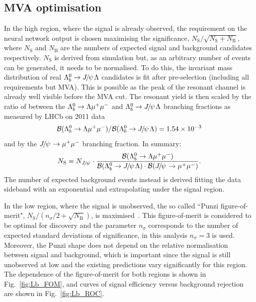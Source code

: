 







\subsection{MVA optimisation}
\label{sec:Lb_mva_opt}

In the high \qsq region, where the signal is already observed, the requirement on the neural network output
is chosen maximising the significance, $N_{\mathrm{S}}/\sqrt{N_{\mathrm{S}}+N_{\mathrm{B}}}$, where
$N_\mathrm{S}$ and $N_\mathrm{B}$ are the numbers of expected signal and background candidates respectively.
$N_\mathrm{S}$ is derived from simulation but, as an arbitrary number of events can be generated, it
needs to be normalised. To do this, the invariant mass distribution of real $\Lb\to\jpsi\Lz$ candidates
is fit after pre-selection (including all requirements but MVA). This is possible as the peak of the resonant
channel is already well visible before the MVA cut. The resonant yield is then scaled by the ratio
of between the ${{\Lambda}^0_{b}}\rightarrow{\ensuremath{\Lambda}}{\ensuremath{\mu^+\mu^-}}$ and $\Lb\to\jpsi\Lz$ branching fractions as measured 
by LHCb on 2011 data 
\begin{equation}
\BR(\Lb\to\Lz\mumu) / \BR(\Lb\to\jpsi\Lz) =  1.54 \times 10^{-3}
\end{equation}
\noindent
and by the $\jpsi\to\mumu$ branching fraction. In summary:
\begin{equation}
N_\mathrm{S} = N_\jpsi \cdot \frac{\BR(\Lb\to\Lz\mumu)}{\BR(\Lb\to\jpsi\Lz) \cdot \BR(\jpsi\to\mumu) }.
\end{equation}
%
The number of expected background events instead is derived fitting the data
sideband with an exponential and extrapolating under the signal region.

In the low \qsq region, where the signal is unobserved, the so called ``Punzi figure-of-merit",
$N_{\mathrm{S}}/(n_\sigma/2+\sqrt{N_{\mathrm{B}}})$, is maximised~\cite{Punzi:2003bu}.
This figure-of-merit is considered to be optimal for discovery and the parameter $n_\sigma$ corresponds to
the number of expected standard deviations of significance, in this analysis $n_\sigma = 3$ is used.
Moreover, the Punzi shape does not depend on the relative normalisation between signal and background, which
is important since the signal is still unobserved at low \qsq and the existing predictions vary significantly
for this region. The dependence of the figure-of-merit for both \qsq regions is shown in Fig.~\ref{fig:Lb_FOM}, and curves
of signal efficiency versus background rejection are shown in Fig.~\ref{fig:Lb_ROC}.

